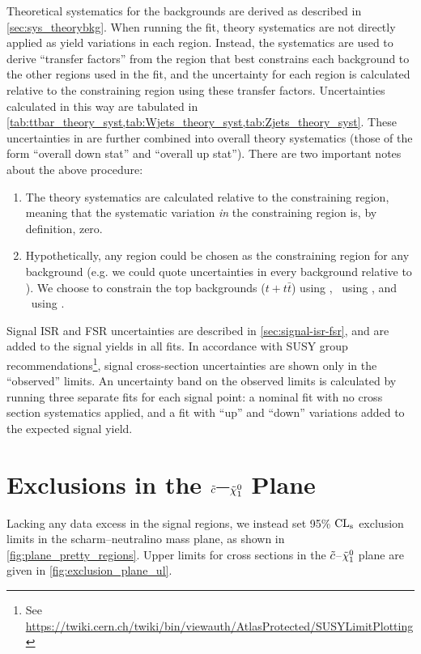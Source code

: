Theoretical systematics for the backgrounds are derived as described in \cref{sec:sys_theorybkg}. When running the fit, theory systematics are not directly applied as yield variations in each region. Instead, the systematics are used to derive ``transfer factors'' from the region that best constrains each background to the other regions used in the fit, and the uncertainty for each region is calculated {relative to the constraining region} using these transfer factors. Uncertainties calculated in this way are tabulated in \cref{tab:ttbar_theory_syst,tab:Wjets_theory_syst,tab:Zjets_theory_syst}. These uncertainties in are further combined into overall theory systematics (those of the form ``overall down stat'' and ``overall up stat''). There are two important notes about the above procedure:
\begin{enumerate}
\item The theory systematics are calculated relative to the constraining region, meaning that the systematic variation {\em in} the constraining region is, by definition, zero.
\item Hypothetically, any region could be chosen as the constraining region for any background (e.g. we could quote uncertainties in every background relative to \crw). We choose to constrain the top backgrounds ($t + t \bar{t}$) using \crt, \wjets\ using \crw, and \zjets\ using \crz.
\end{enumerate}

Signal ISR and FSR uncertainties are described in \cref{sec:signal-isr-fsr}, and are added to the signal yields in all fits.
In accordance with SUSY group recommendations\footnote{See \url{https://twiki.cern.ch/twiki/bin/viewauth/AtlasProtected/SUSYLimitPlotting}},
signal cross-section uncertainties are shown only in the ``observed''
limits. An uncertainty band on the observed limits is calculated by
running three separate fits for each signal point: a nominal fit with
no cross section systematics applied, and a fit with ``up'' and ``down''
variations added to the expected signal yield.

\section{Exclusions in the $\tilde{c}$--$\tilde{\chi}_1^0$ Plane}

Lacking any data excess in the signal regions, we instead set 95\% $\mathrm{CL}_{\mathrm{s}}$ exclusion limits in the scharm--neutralino mass plane, as shown in \cref{fig:plane_pretty_regions}. Upper limits for cross sections in the $\tilde{c}$--$\tilde{\chi}_1^0$ plane are given in \cref{fig:exclusion_plane_ul}.

